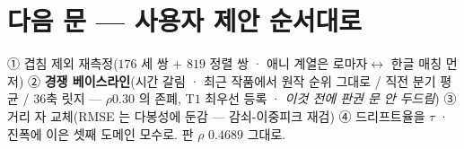 \documentclass[10pt,a4paper]{article}
\begin{document}
\section{다음 문 --- 사용자 제안 순서대로}

① 겹침 제외 재측정($176$ 세 쌍 $+$ $819$ 정렬 쌍 · 애니 계열은 로마자$\leftrightarrow$
한글 매칭 먼저) ② \textbf{경쟁 베이스라인}(시간 갈림 · 최근 작품에서 원작
순위 그대로 / 직전 분기 평균 / $36$축 릿지 --- $\rho 0.30$ 의 존폐, T$1$ 최우선
등록 · \emph{이것 전에 판권 문 안 두드림}) ③ 거리 자 교체(RMSE 는 다봉성에
둔감 --- 감쇠-이중피크 재검) ④ 드리프트율을 $\tau$ · 진폭에 이은 셋째 도메인
모수로. 판 $\rho$ $0.4689$ 그대로.
\end{document}
